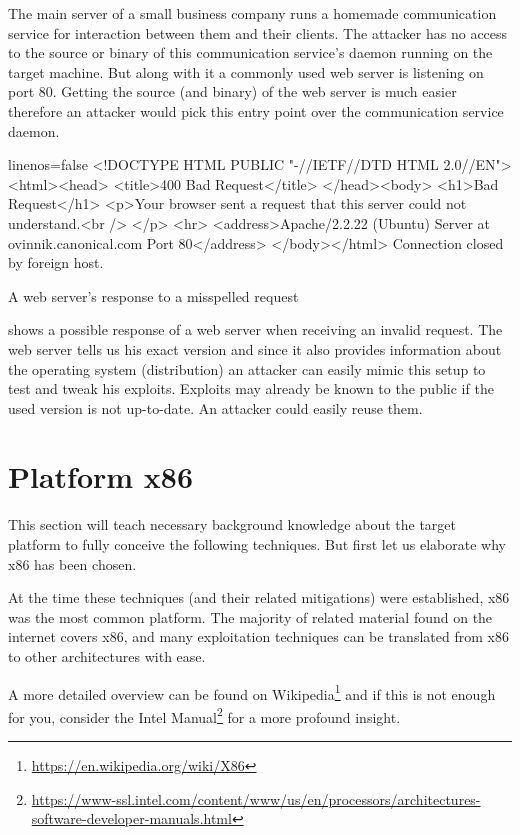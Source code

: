 \documentclass[article]{uibk}
\begin{document}
The main server of a small business company runs a homemade communication
service for interaction between them and their clients. The attacker has no
access to the source or binary of this communication service's daemon running
on the target machine. But along with it a commonly used web server is
listening on port 80. Getting the source (and binary) of the web server is much
easier therefore an attacker would pick this entry point over the communication
service daemon.

\begin{listing}[h!]
    \begin{code*}{linenos=false}
        <!DOCTYPE HTML PUBLIC "-//IETF//DTD HTML 2.0//EN">
        <html><head>
        <title>400 Bad Request</title>
        </head><body>
        <h1>Bad Request</h1>
        <p>Your browser sent a request that this server could not understand.<br />
        </p>
        <hr>
        <address>Apache/2.2.22 (Ubuntu) Server at ovinnik.canonical.com Port 80</address>
        </body></html>
        Connection closed by foreign host.
    \end{code*}
    \caption{A web server's response to a misspelled request}
    \label{src:http_response}
\end{listing}

 shows a possible response of a web server when
receiving an invalid request. The web server tells us his exact version and
since it also provides information about the operating system (distribution) an
attacker can easily mimic this setup to test and tweak his exploits. Exploits
may already be known to the public if the used version is not up-to-date. An
attacker could easily reuse them.

\section{Platform x86}
\label{sec:x86}

This section will teach necessary background knowledge about the target
platform to fully conceive the following techniques. But first let us elaborate
why x86 has been chosen.

At the time these techniques (and their related mitigations) were established,
x86 was the most common platform. The majority of related material found on the
internet covers x86, and many exploitation techniques can be translated from
x86 to other architectures with ease.

A more detailed overview can be found on
Wikipedia\footnote{\url{https://en.wikipedia.org/wiki/X86}} and if this is not
enough for you, consider the Intel
Manual\footnote{\url{https://www-ssl.intel.com/content/www/us/en/processors/architectures-software-developer-manuals.html}}
for a more profound insight.
\end{document}
